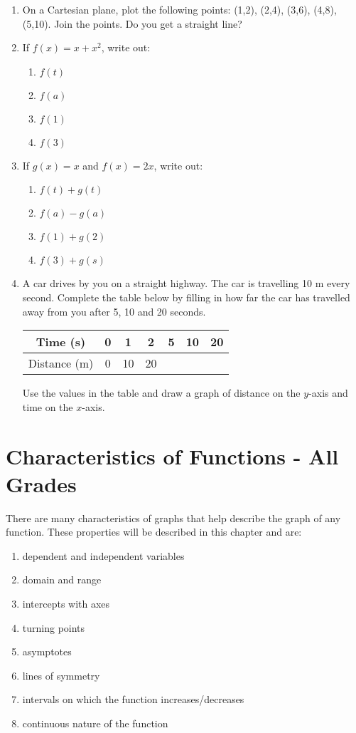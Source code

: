 \documentclass[10pt,a4paper,titlepage,twoside,openright]{report}
\begin{document}
{\begin{enumerate}
\item{On a Cartesian plane, plot the following points: (1,2), (2,4), (3,6), (4,8), (5,10). Join the points. Do you get a straight line?}
\item{If $f(x)=x+x^2$, write out:
\begin{enumerate}
\item{$f(t)$}
\item{$f(a)$}
\item{$f(1)$}
\item{$f(3)$}
\end{enumerate}}
\item{If $g(x)=x$ and $f(x)=2x$, write out:
\begin{enumerate}
\item{$f(t)+g(t)$}
\item{$f(a)-g(a)$}
\item{$f(1)+g(2)$}
\item{$f(3)+g(s)$}
\end{enumerate}}
\item{A car drives by you on a straight highway. The car is travelling 10 m every
second. Complete the table below by filling in how far the car has travelled
away from you after 5, 10 and 20 seconds.
\begin{center}
\begin{tabular}{|c||c|c|c|c|c|c|}\hline
Time (s) & 0 & 1 &2 &5 &10 &20\\\hline
Distance (m)& 0 & 10&20 & & & \\\hline
\end{tabular}
\end{center}

Use the values in the table and draw a graph of distance on the $y$-axis and time on the $x$-axis.}
\end{enumerate}}

\section{Characteristics of Functions - All Grades}
There are many characteristics of graphs that help describe the graph of any function. These properties will be described in this chapter and are:
\begin{enumerate}
\item{dependent and independent variables}
\item{domain and range}
\item{intercepts with axes}
\item{turning points}
\item{asymptotes}
\item{lines of symmetry}
\item{intervals on which the function increases/decreases}
\item{continuous nature of the function}
\end{enumerate}
\end{document}
